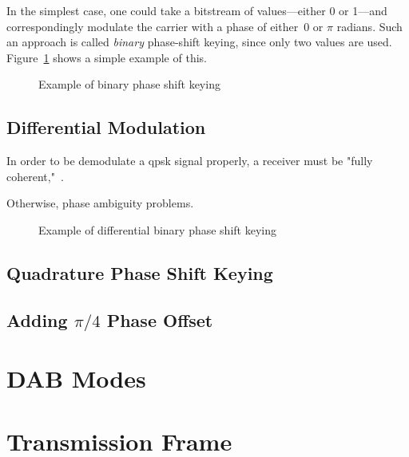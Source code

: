 \documentclass[class=report,11pt,crop=false]{standalone}
\begin{document}
In the simplest case, one could take a bitstream of values---either 0 or 1---and correspondingly modulate the carrier with a phase of either~\(0\) or \(\pi\) radians. Such an approach is called \emph{binary} phase-shift keying, since only two values are used. Figure~\ref{fig:binary-psk} shows a simple example of this.

\begin{figure}[htbp]
    \centering
    \captionsetup{type=figure}
    \def\svgwidth{1\linewidth}
    { %
        }
    \caption{Example of binary phase shift keying}
    \label{fig:binary-psk}
\end{figure}

\subsection{Differential Modulation}
In order to be demodulate a \gls{qpsk} signal properly, a receiver must be "fully coherent,"~\cite{Moosea}.

Otherwise, phase ambiguity problems.


\begin{figure}[htbp]
    \centering
    \captionsetup{type=figure}
    \def\svgwidth{1\linewidth}
    { %
        }
    \caption{Example of differential binary phase shift keying}
    \label{fig:differential-binary-psk}
\end{figure}

\subsection{Quadrature Phase Shift Keying}

\subsection{Adding $\pi/4$ Phase Offset}

\section{DAB Modes}

\section{Transmission Frame}
\end{document}

